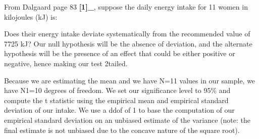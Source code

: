 \documentclass[letterpaper,10pt,english]{sphinxmanual}
\begin{document}
\begin{fulllineitems}
\sphinxAtStartPar
From Dalgaard page 83 {\color{red}\bfseries{}{[}1{]}\_}, suppose the daily energy intake for 11
women in kilojoules (kJ) is:

\begin{sphinxVerbatim}[commandchars=\\\{\}]
  \PYG{p}{[}        \PYGZbs{}
                     \PYG{p}{]}
\end{sphinxVerbatim}

\sphinxAtStartPar
Does their energy intake deviate systematically from the recommended
value of 7725 kJ? Our null hypothesis will be the absence of deviation,
and the alternate hypothesis will be the presence of an effect that could be
either positive or negative, hence making our test 2\sphinxhyphen{}tailed.

\sphinxAtStartPar
Because we are estimating the mean and we have N=11 values in our sample,
we have N\sphinxhyphen{}1=10 degrees of freedom. We set our significance level to 95\% and
compute the t statistic using the empirical mean and empirical standard
deviation of our intake. We use a ddof of 1 to base the computation of our
empirical standard deviation on an unbiased estimate of the variance (note:
the final estimate is not unbiased due to the concave nature of the square
root).

\begin{sphinxVerbatim}[commandchars=\\\{\}]
  
\end{sphinxVerbatim}


\end{fulllineitems}
\end{document}
